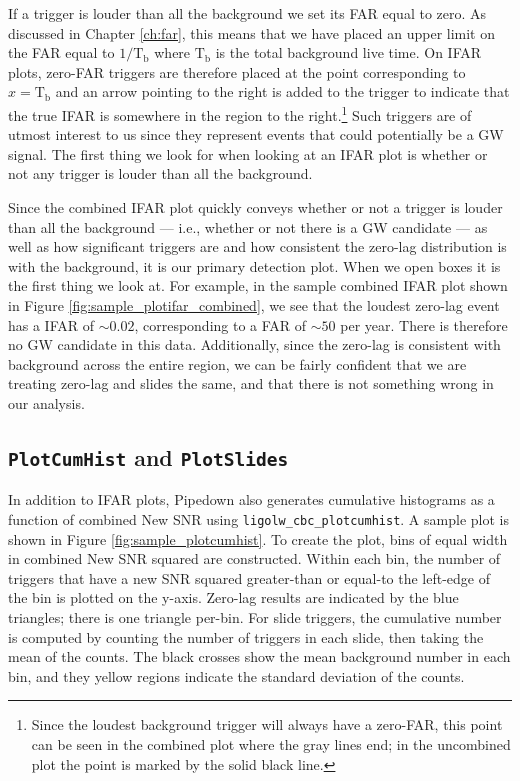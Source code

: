If a trigger is louder than all the background we set its \ac{FAR} equal to
zero. As discussed in Chapter \ref{ch:far}, this means that we have placed an
upper limit on the \ac{FAR} equal to $1/\mathrm{T_b}$ where $\mathrm{T_b}$ is
the total background live time. On IFAR plots, zero-\ac{FAR} triggers are
therefore placed at the point corresponding to $x=\mathrm{T_b}$ and an arrow
pointing to the right is added to the trigger to indicate that the true IFAR is
somewhere in the region to the right.\footnote{Since the loudest background
trigger will always have a zero-FAR, this point can be seen in the combined
plot where the gray lines end; in the uncombined plot the point is marked by
the solid black line.} Such triggers are of utmost interest to us since they
represent events that could potentially be a \ac{GW} signal. The first thing we
look for when looking at an IFAR plot is whether or not any trigger is louder
than all the background.

Since the combined IFAR plot quickly conveys whether or not a trigger is louder
than all the background --- i.e., whether or not there is a \ac{GW} candidate
--- as well as how significant triggers are and how consistent the zero-lag
distribution is with the background, it is our primary detection plot. When we
open boxes it is the first thing we look at. For example, in the sample
combined IFAR plot shown in Figure \ref{fig:sample_plotifar_combined}, we see
that the loudest zero-lag event has a IFAR of $\sim0.02$, corresponding to a
\ac{FAR} of $\sim50$ per year. There is therefore no \ac{GW} candidate in this
data. Additionally, since the zero-lag is consistent with background across the
entire region, we can be fairly confident that we are treating zero-lag and
slides the same, and that there is not something wrong in our analysis.

\subsection{\texttt{PlotCumHist} and \texttt{PlotSlides}}
\label{sec:plotcumhist-plotslides}

In addition to IFAR plots, Pipedown also generates cumulative histograms as a
function of combined New \ac{SNR} using \verb|ligolw_cbc_plotcumhist|. A sample
plot is shown in Figure \ref{fig:sample_plotcumhist}. To create the plot, bins
of equal width in combined New \ac{SNR} squared are constructed. Within each bin, the
number of triggers that have a new \ac{SNR} squared greater-than or equal-to
the left-edge of the bin is plotted on the y-axis. Zero-lag results are
indicated by the blue triangles; there is one triangle per-bin. For slide
triggers, the cumulative number is computed by counting the number of triggers
in each slide, then taking the mean of the counts. The black crosses show the
mean background number in each bin, and they yellow regions indicate the
standard deviation of the counts. 

